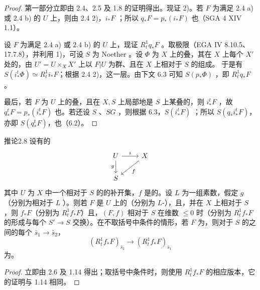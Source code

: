 \begin{proof}
第一部分立即由 2.4、2.5 及 1.8 的证明得出。现证 2)。若 $F$ 为满足 2.4 a) 或 2.4 b) 的 $U$ 上，则由 2.4 2)，$i_*F$ ；所以 $q_*F=p_*(i_*F)$ 也（SGA 4 XIV 1.1）。

设 $F$ 为满足 2.4 a) 或 2.4 b) 的 $U$ 上，现证 $R^1_tq_*F$ 。取极限（EGA IV 8.10.5、17.7.8），并利用 1)，可设 $S$ 为 Noether 。设 $\Phi$ 为 $X$ 上的叠，其在 $X$ 上每个 $X'$ 处的，由 $U'=U\times_XX'$ 上以 $F|U$ 为群、且在 $X$ 上相对于 $S$ 的组成。
于是有 $S(i_*^t\Phi)\simeq R^1_ti_*F$；根据 2.4 2)，这一层。由下文 6.3 可知 $S(p_*\Phi)$ ，即 $R^1_tq_*F$ 。

最后，若 $F$ 为 $U$ 上的叠，且在 $X,S$ 上局部地是 $S$ 上某叠的，则 $i_*^tF$ ，故 $q_*^tF=p_*(i_*^tF)$ 也。若还设 $S$ 、$SG$ ，则根据 6.3，$S(i_*^tF)$ ；所以 $S(q_*i_*^tF)$，亦即 $S(q_*^tF)$，也（6.2）。
\end{proof}

\begin{SGAresult}{推论}{2.8}
设有的
\[
\begin{tikzcd}
U\arrow[r,"i"]\arrow[d,"g"']&X\arrow[dl,"f"]\\
S&
\end{tikzcd}
\]
其中 $U$ 为 $X$ 中一个相对于 $S$ 的的补开集，$f$ 是的。设 $L$ 为一组素数，假定 $g$ （分别为相对于 $L$ ）。则若 $F$ 是 $U$ 上的（分别为 $L$-），且，并在 $X$ 上相对于 $S$ ，则 $f_*F$（分别为 $R^1_tf_*F$）且，$(F,f)$ 相对于 $S$ 在维数 $\leqslant0$ 时（分别为 $R^1_tf_*F$ 的形成与每个 $S'\to S$ 交换）。在不取括号中条件的情形，若 $F$ 为，则对于 $S$ 的之间的每个 $\bar s_1\to\bar s_2$，
\[(R^1_tf_*F)_{\bar s_2}\longrightarrow(R^1_tf_*F)_{\bar s_1}\]
为。
\end{SGAresult}
\begin{proof}
立即由 2.6 及 1.14 得出；取括号中条件时，则使用 $R^1_tf_*F$ 的相应版本，它的证明与 1.14 相同。
\end{proof}

